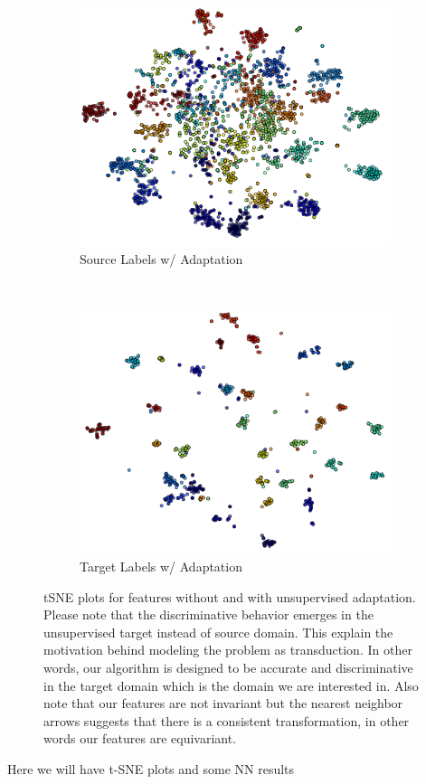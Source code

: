 \begin{figure}[ht]
    \begin{subfigure}[b]{0.5\textwidth}
        \includegraphics[width=\textwidth]{sc.png}
        \caption{Source Labels w/ Adaptation}
        \label{fig:gull}
    \end{subfigure}~\begin{subfigure}[b]{0.5\textwidth}
        \includegraphics[width=\textwidth]{tc.png}
        \caption{Target Labels w/ Adaptation}
        \label{fig:gull}
    \end{subfigure}
\caption{tSNE plots for features without and with unsupervised adaptation. Please note that the discriminative behavior emerges in the unsupervised target instead of source domain. This explain the motivation behind modeling the problem as transduction. In other words, our algorithm is designed to be accurate and discriminative in the target domain which is the domain we are interested in. Also note that our features are not invariant but the nearest neighbor arrows suggests that there is a consistent transformation, in other words our features are equivariant. }
\end{figure}


Here we will have t-SNE plots and some NN results

